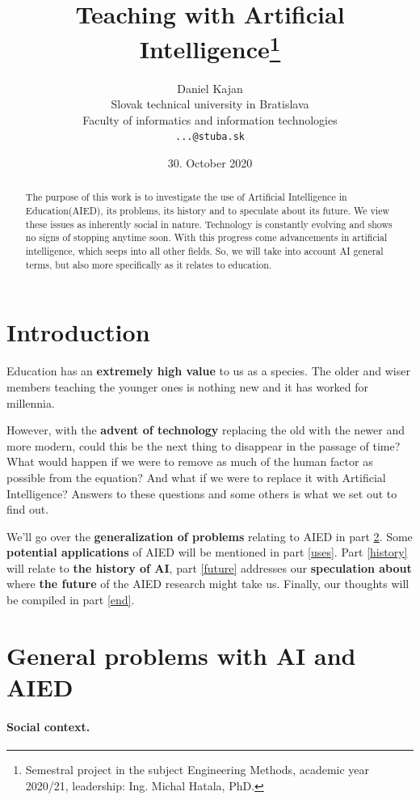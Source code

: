 \documentclass[10pt,a4paper,]{article}
\title{Teaching with Artificial Intelligence\thanks{Semestral project in the subject Engineering Methods, academic year 2020/21, leadership: Ing. Michal Hatala, PhD.}}
\author{Daniel Kajan\\
	{\small Slovak technical university in Bratislava}\\
	{\small Faculty of informatics and information technologies}\\
	{\small \texttt{...@stuba.sk}}
	}
\date{\small 30. October 2020}
\begin{document}
\maketitle

\begin{abstract}
The purpose of this work is to investigate the use of Artificial Intelligence in Education(AIED), its problems, its history and to speculate about its future. We view these issues as inherently social in nature. Technology is constantly evolving and shows no signs of stopping anytime soon. With this progress come advancements in artificial intelligence, which seeps into all other fields. So, we will take into account AI general terms, but also more specifically as it relates to education.
\end{abstract}



\section{Introduction}

Education has an \textbf{extremely high value} to us as a species. The older and wiser members teaching the
younger ones is nothing new and it has worked for millennia. 

However, with the \textbf{advent of technology} replacing the old with the newer and more modern, could this be the next thing to disappear in the passage of time? What would happen if we were to remove as much of the human factor as possible from the equation? And what if we were to replace it with Artificial Intelligence? Answers to these questions and some others is what we set out to find out.

We'll go over the \textbf{generalization of problems} relating to AIED in part \ref{general}. Some \textbf{potential applications} of AIED will be mentioned in part \ref{uses}. Part \ref{history} will relate to \textbf{the history of AI}, part \ref{future} addresses our \textbf{speculation about} where \textbf{the future} of the AIED research might take us. Finally, our thoughts will be compiled in part \ref{end}.

\section{General problems with AI and AIED} \label{general}

\paragraph{Social context.}
\end{document}
